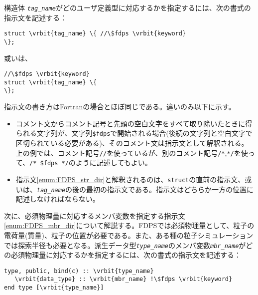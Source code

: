 構造体 \textit{\texttt{tag\_name}}がどのユーザ定義型に対応するかを指定するには、次の書式の指示文を記述する：
\begin{screen}
\begin{Verbatim}[commandchars=\\\{\}]
struct \vrbit{tag_name} \{ //\$fdps \vrbit{keyword}
\};
\end{Verbatim}
\end{screen}

或いは、

\begin{screen}
\begin{Verbatim}[commandchars=\\\{\}]
//\$fdps \vrbit{keyword}
struct \vrbit{tag_name} \{
\};
\end{Verbatim}
\end{screen}
指示文の書き方はFortranの場合とほぼ同じである。違いのみ以下に示す。
\begin{itemize}[leftmargin=*]
\item コメント文からコメント記号と先頭の空白文字をすべて取り除いたときに得られる文字列が、文字列\verb|$fdps|で開始される場合(後続の文字列と空白文字で区切られている必要がある)、そのコメント文は指示文として解釈される。上の例では、コメント記号\texttt{//}を使っているが、別のコメント記号\texttt{/*},\texttt{*/}を使って、\texttt{/* \$fdps */}のように記述してもよい。
\item 指示文\ref{enum:FDPS_str_dir}と解釈されるのは、\texttt{struct}の直前の指示文、或いは、\textit{\texttt{tag\_name}}の後の最初の指示文である。指示文はどちらか一方の位置に記述しなければならない。
\end{itemize}


次に、必須物理量に対応するメンバ変数を指定する指示文\ref{enum:FDPS_mbr_dir}について解説する。FDPSでは必須物理量として、粒子の電荷量(質量)、粒子の位置が必要である。また、ある種の粒子シミュレーションでは探索半径も必要となる。派生データ型\textit{\texttt{type\_name}}のメンバ変数\textit{\texttt{mbr\_name}}がどの必須物理量に対応するかを指定するには、次の書式の指示文を記述する：
\begin{screen}
\begin{Verbatim}[commandchars=\\\{\}]
type, public, bind(c) :: \vrbit{type_name}
   \vrbit{data_type} :: \vrbit{mbr_name} !\$fdps \vrbit{keyword}
end type [\vrbit{type_name}]
\end{Verbatim}
\end{screen}


